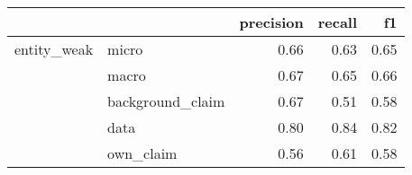 \begin{tabular}{llrrr}
\toprule
            &           &  precision &  recall &   f1 \\
\midrule
entity\_weak & micro &       0.66 &    0.63 & 0.65 \\
            & macro &       0.67 &    0.65 & 0.66 \\
            & background\_claim &       0.67 &    0.51 & 0.58 \\
            & data &       0.80 &    0.84 & 0.82 \\
            & own\_claim &       0.56 &    0.61 & 0.58 \\
\bottomrule
\end{tabular}
